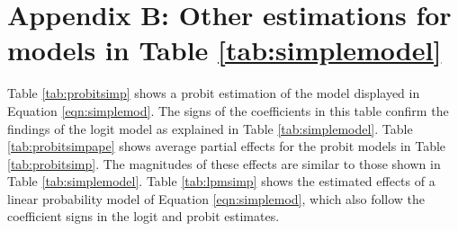 \documentclass[12pt,a4]{article}\usepackage[]{graphicx}\usepackage[]{xcolor}
\begin{document}
\section{Appendix B: Other estimations for models in Table \ref{tab:simplemodel}}
\label{app:second}
Table \ref{tab:probitsimp} shows a probit estimation of the model displayed in Equation \ref{eqn:simplemod}. The signs of the coefficients in this table confirm the findings of the logit model as explained in Table \ref{tab:simplemodel}. Table \ref{tab:probitsimpape} shows average partial effects for the probit models in Table \ref{tab:probitsimp}. The magnitudes of these effects are similar to those shown in Table \ref{tab:simplemodel}. Table \ref{tab:lpmsimp} shows the estimated effects of a linear probability model of Equation \ref{eqn:simplemod}, which also follow the coefficient signs in the logit and probit estimates.
\end{document}
